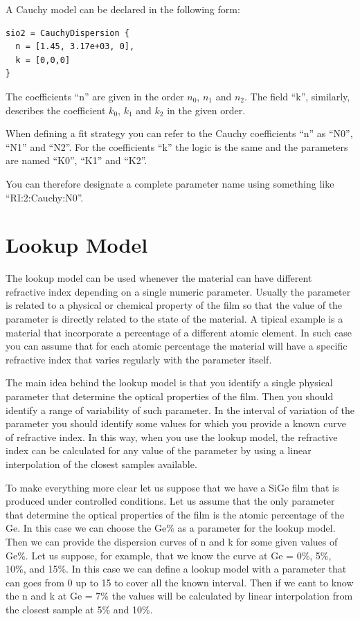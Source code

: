 \documentclass[a4paper]{report}
\begin{document}
A Cauchy model can be declared in the following form:
\begin{verbatim}
sio2 = CauchyDispersion { 
  n = [1.45, 3.17e+03, 0], 
  k = [0,0,0]
}
\end{verbatim}
The coefficients ``n'' are given in the order $n_0$, $n_1$ and $n_2$. The field ``k'', similarly, describes the coefficient $k_0$, $k_1$ and $k_2$ in the given order.

When defining a fit strategy you can refer to the Cauchy coefficients ``n'' as ``N0'', ``N1'' and ``N2''. For the coefficients ``k'' the logic is the same and the parameters are named ``K0'', ``K1'' and ``K2''.

You can therefore designate a complete parameter name using something like ``RI:2:Cauchy:N0''.

\section{Lookup Model}

The lookup model can be used whenever the material can have different refractive index depending on a single numeric parameter.
Usually the parameter is related to a physical or chemical property of the film so that the value of the parameter is directly related to the state of the material.
A tipical example is a material that incorporate a percentage of a different atomic element.
In such case you can assume that for each atomic percentage the material will have a specific refractive index that varies regularly with the parameter itself.

The main idea behind the lookup model is that you identify a single physical parameter that determine the optical properties of the film.
Then you should identify a range of variability of such parameter.
In the interval of variation of the parameter you should identify some values for which you provide a known curve of refractive index.
In this way, when you use the lookup model, the refractive index can be calculated for any value of the parameter by using a linear interpolation of the closest samples available.

To make everything more clear let us suppose that we have a SiGe film that is produced under controlled conditions.
Let us assume that the only parameter that determine the optical properties of the film is the atomic percentage of the Ge.
In this case we can choose the Ge\% as a parameter for the lookup model.
Then we can provide the dispersion curves of n and k for some given values of Ge\%.
Let us suppose, for example, that we know the curve at Ge = 0\%, 5\%, 10\%, and 15\%.
In this case we can define a lookup model with a parameter that can goes from 0 up to 15 to cover all the known interval.
Then if we cant to know the n and k at Ge = 7\% the values will be calculated by linear interpolation from the closest sample at 5\% and 10\%.
\end{document}
